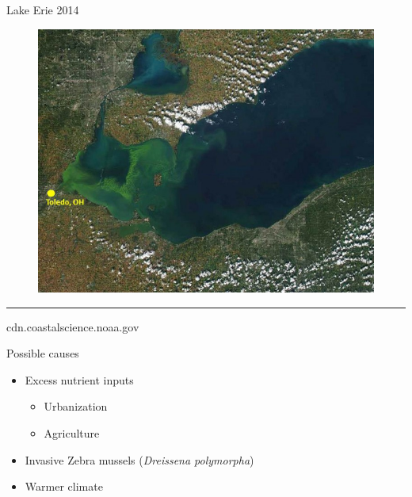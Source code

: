 \begin{frame}{Lake Erie 2014}
	\begin{figure}
		\centering
		\includegraphics[scale=0.35]{erie.jpg}
	\end{figure}
\hrule
{\tiny cdn.coastalscience.noaa.gov}
\end{frame}
\begin{frame}{Possible causes}
	\begin{itemize}
		 
		\item Excess nutrient inputs
			\begin{itemize}
				\item Urbanization 
				\item Agriculture 
			\end{itemize}
		\item Invasive Zebra mussels (\emph{Dreissena polymorpha})
		\item Warmer climate
	\end{itemize}

	
\end{frame}
